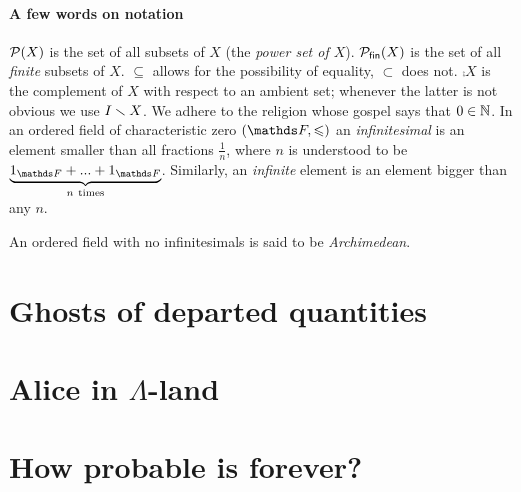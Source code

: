 \documentclass[a4paper,50 pt,titlepage,twoside,colorlinks=true,allcolors=circusroyale4]{book}
\begin{document}
\subsubsection*{A few words on notation}
$\mathcal{P}(X)$ is the set of all subsets of $X$ (the \emph{power set of $X$}). $\mathcal{P}_{\mathsf{fin}}(X)$ is the set of all \textit{finite} subsets of $X$. $\subseteq$ allows for the possibility of equality, $\subset$ does not. $\comp{X}$ is the complement of $X$ with respect to an ambient set; whenever the latter is not obvious we use $I \smallsetminus X$. We adhere to the religion whose gospel says that $0 \in \mathbb{N}$. In an ordered field of characteristic zero $(\ds{F}, \leq)$ an \emph{infinitesimal} is an element smaller than all fractions $\frac{1}{n}$, where $n$ is understood to be $\underbrace{1_{\ds{F}} + ... + 1_{\ds{F}}}_{n \ \mathrm{times}}$. Similarly, an \emph{infinite} element is an element bigger than any $n$. \par An ordered field with no infinitesimals is said to be \emph{Archimedean}.
\chapter{Ghosts of departed quantities}

\chapter{Alice in $\Lambda$-land}

\chapter{How probable is forever?}


	\medskip
\printbibliography
\end{document}

